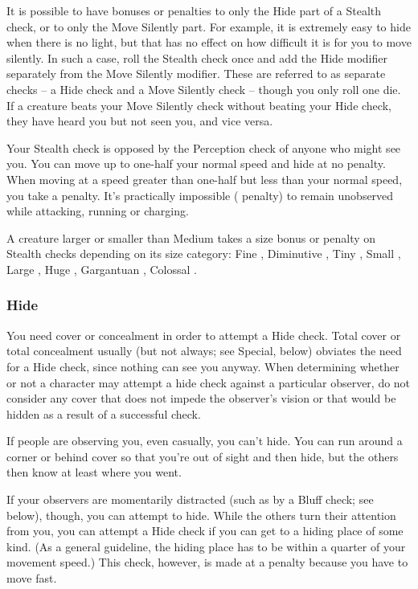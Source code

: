 It is possible to have bonuses or penalties to only the Hide part of a Stealth check, or to only the Move Silently part. For example, it is extremely easy to hide when there is no light, but that has no effect on how difficult it is for you to move silently. In such a case, roll the Stealth check once and add the Hide modifier separately from the Move Silently modifier. These are referred to as separate checks -- a Hide check and a Move Silently check -- though you only roll one die. If a creature beats your Move Silently check without beating your Hide check, they have heard you but not seen you, and vice versa.

 Your Stealth check is opposed by the Perception check of anyone who might see you. You can move up to one-half your normal speed and hide at no penalty. When moving at a speed greater than one-half but less than your normal speed, you take a  penalty. It's practically impossible ( penalty) to remain unobserved while attacking, running or charging.

A creature larger or smaller than Medium takes a size bonus or penalty on Stealth checks depending on its size category: Fine , Diminutive , Tiny , Small , Large , Huge , Gargantuan , Colossal .

\subsubsection{Hide}
You need cover or concealment in order to attempt a Hide check. Total cover or total concealment usually (but not always; see Special, below) obviates the need for a Hide check, since nothing can see you anyway. When determining whether or not a character may attempt a hide check against a particular observer, do not consider any cover that does not impede the observer's vision or that would be hidden as a result of a successful check.

If people are observing you, even casually, you can't hide. You can run around a corner or behind cover so that you're out of sight and then hide, but the others then know at least where you went.

If your observers are momentarily distracted (such as by a Bluff check; see below), though, you can attempt to hide. While the others turn their attention from you, you can attempt a Hide check if you can get to a hiding place of some kind. (As a general guideline, the hiding place has to be within a quarter of your movement speed.) This check, however, is made at a  penalty because you have to move fast.

